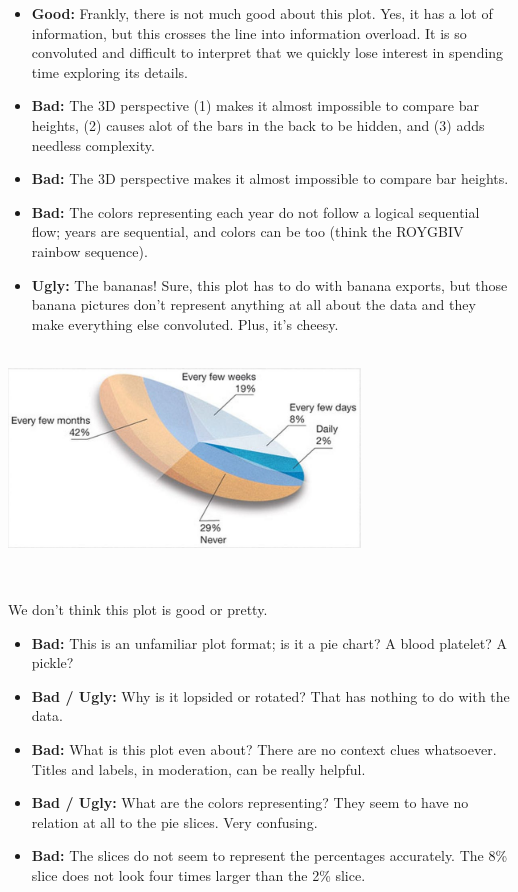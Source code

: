 \documentclass[]{book}
\providecommand{\tightlist}{%
  \setlength{\itemsep}{0pt}\setlength{\parskip}{0pt}}
\begin{document}
\begin{itemize}
\tightlist
\item
  \textbf{Good:} Frankly, there is not much good about this plot. Yes, it has a lot of information, but this crosses the line into information overload. It is so convoluted and difficult to interpret that we quickly lose interest in spending time exploring its details.\\
\item
  \textbf{Bad:} The 3D perspective (1) makes it almost impossible to compare bar heights, (2) causes alot of the bars in the back to be hidden, and (3) adds needless complexity.\\
\item
  \textbf{Bad:} The 3D perspective makes it almost impossible to compare bar heights.
\item
  \textbf{Bad:} The colors representing each year do not follow a logical sequential flow; years are sequential, and colors can be too (think the ROYGBIV rainbow sequence).\\
\item
  \textbf{Ugly:} The bananas! Sure, this plot has to do with banana exports, but those banana pictures don't represent anything at all about the data and they make everything else convoluted. Plus, it's cheesy.
\end{itemize}

~\\

\includegraphics[width=0.7\textwidth,height=\textheight]{img/vis2.jpeg}

~

We don't think this plot is good or pretty.

\begin{itemize}
\tightlist
\item
  \textbf{Bad:} This is an unfamiliar plot format; is it a pie chart? A blood platelet? A pickle?
\item
  \textbf{Bad / Ugly:} Why is it lopsided or rotated? That has nothing to do with the data.
\item
  \textbf{Bad:} What is this plot even about? There are no context clues whatsoever. Titles and labels, in moderation, can be really helpful.
\item
  \textbf{Bad / Ugly:} What are the colors representing? They seem to have no relation at all to the pie slices. Very confusing.
\item
  \textbf{Bad:} The slices do not seem to represent the percentages accurately. The 8\% slice does not look four times larger than the 2\% slice.
\end{itemize}
\end{document}
